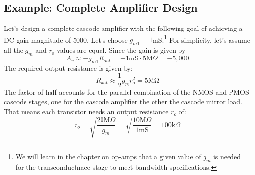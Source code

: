\subsection{Example:  Complete Amplifier Design}
Let's design a complete cascode amplifier with the following goal of achieving a DC gain magnitude of 5000.   Let's choose $g_{m1} = 1$mS.\footnote{We will learn in the chapter on op-amps that a given value of $g_m$ is needed for the transconductnace stage to meet bandwidth specifications.} For simplicity, let's assume all the $g_m$ and $r_o$ values are equal.  Since the gain is given by
    \begin{equation} 
        {A_v} \approx  - {g_{m1}}{R_{out}} =  - 1\mathrm{mS} \cdot 5\mathrm{M}\Omega  =  - 5,000 
    \end{equation}
The required output resistance is given by:
    \begin{equation} 
        {R_{out}} \approx \frac{1}{2}{g_m}r_o^2 = 5\mathrm{M\Omega} 
    \end{equation}
The factor of half accounts for the parallel combination of the NMOS and PMOS cascode stages, one for the cascode amplifier the other the cascode mirror load.  That means each transistor needs an output resistance $r_o$ of:
    \begin{equation} 
        {r_o} = \sqrt {\frac{{20\mathrm{M}\Omega }}{{{g_m}}}}  = \sqrt {\frac{{10\mathrm{M}\Omega }}{{1\mathrm{mS}}}}  = 100\mathrm{k}\Omega 
    \end{equation}
